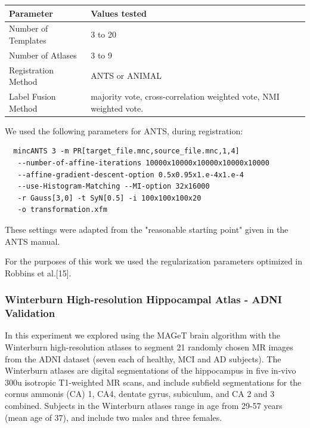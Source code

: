 \documentclass{article}\usepackage{graphicx, color}
\newcommand{\marginnote}[1]{\-\marginpar[\raggedleft\footnotesize #1]{\raggedright\footnotesize #1}}
\newcommand{\todo}[1]{\marginnote{\textcolor{red}{TODO #1}}}
\begin{document}
\begin{table}
    \begin{tabular}{l|l}
        Parameter           & Values tested                                                      \\ \hline
        Number of Templates & 3 to 20                                                            \\ 
        Number of Atlases   & 3 to 9                                                             \\ 
        Registration Method & ANTS or ANIMAL                                                     \\ 
        Label Fusion Method & majority vote, cross-correlation weighted vote, NMI weighted vote. 
    \end{tabular}
\end{table}

We used the following parameters for ANTS, during registration: 
\begin{verbatim}
  mincANTS 3 -m PR[target_file.mnc,source_file.mnc,1,4] 
   --number-of-affine-iterations 10000x10000x10000x10000x10000 
   --affine-gradient-descent-option 0.5x0.95x1.e-4x1.e-4
   --use-Histogram-Matching --MI-option 32x16000
   -r Gauss[3,0] -t SyN[0.5] -i 100x100x100x20
   -o transformation.xfm
 \end{verbatim}
These settings were adapted from the "reasonable starting point" given in the
ANTS manual. \todo{<rationale?>}

For the purposes of this work we used the regularization parameters optimized
in Robbins et al.[15]. \todo{right? (but added a second layer).}

\todo{multi-atlas comparison, "naive" comparison}

\subsubsection{Winterburn High-resolution Hippocampal Atlas - ADNI Validation}

In this experiment we explored using the MAGeT brain algorithm with the
Winterburn high-resolution atlases to segment 21 randomly chosen MR images from
the ADNI dataset (seven each of healthy, MCI and AD subjects).  The Winterburn
atlases are digital segmentations of the hippocampus in five  in-vivo 300u
isotropic T1-weighted MR scans, and include subfield segmentations for the
cornus ammonis (CA) 1, CA4, dentate gyrus, subiculum, and CA 2 and 3 combined.
Subjects in the Winterburn atlases range in age from 29-57 years (mean age of
37), and include two males and three females.  
\end{document}
